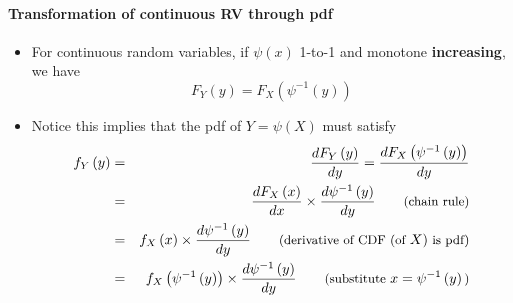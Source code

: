 \documentclass[smaller]{beamer}\usepackage[]{graphicx}\usepackage[]{color}
\newenvironment{stepitemize}{\begin{itemize}[<+->]}{\end{itemize} }
\begin{document}
\begin{frame}{\secname}
  \framesubtitle{Transformation of continuous RV through pdf}

  \begin{stepitemize}
  \item For continuous random variables, if $\psi \left( x\right) $ 1-to-1 and
  monotone \textbf{increasing}, we have%
  \begin{equation*}
  F_{Y}\left( y\right) =F_{X}\left( \psi ^{-1}\left( y\right) \right)
  \end{equation*}

  \item Notice this implies that the pdf of $Y=\psi \left( X\right) $ must
  satisfy%
  \begin{eqnarray*}
  f_{Y}\left( y\right) &=&\frac{dF_{Y}\left( y\right) }{dy}=\frac{dF_{X}\left(
  \psi ^{-1}\left( y\right) \right) }{dy} \\
  &=&\frac{dF_{X}\left( x\right) }{dx}\times \frac{d\psi ^{-1}\left( y\right)
  }{dy}\qquad \text{{\small (chain rule)}} \\
  &=&f_{X}\left( x\right) \times \frac{d\psi ^{-1}\left( y\right) }{dy}\qquad
  \text{{\small (derivative of CDF (of }}X\text{){\small \ is pdf)}} \\
  &=&f_{X}\left( \psi ^{-1}\left( y\right) \right) \times \frac{d\psi
  ^{-1}\left( y\right) }{dy}\qquad \text{{\small (substitute }}x=\psi
  ^{-1}\left( y\right) \text{{\small )}}
  \end{eqnarray*}
  \end{stepitemize}

\end{frame}
\end{document}
